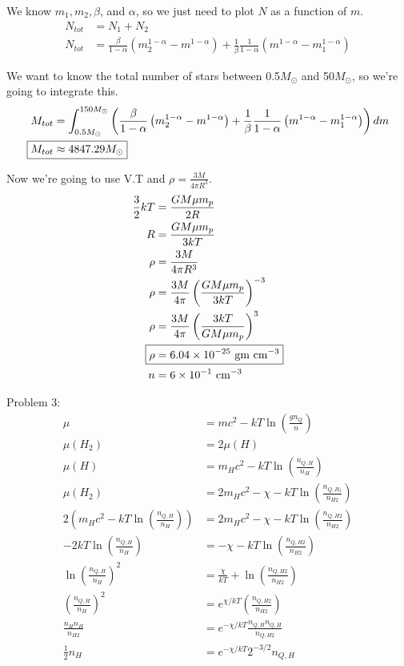 \documentclass[10pt,letter,preprint]{aastex}
\newcommand{\rp}{\right)}
\newcommand{\lp}{\left(}
\begin{document}
We know $m_{1},m_{2},\beta$, and $\alpha$, so we just need to plot $N$ as a function of $m$.
\begin{align}
N_{tot} &= N_{1}+N_{2} \\
N_{tot} &=  \frac{\beta}{1-\alpha} \lp m_{2}^{1-\alpha} - m^{1-\alpha} \rp + \frac{1}{\beta} \frac{1}{1-\alpha } \lp m^{1-\alpha} -m_{1}^{1-\alpha} \rp
\end{align}

We want to know the total number of stars between 0.5$M_{\odot}$ and 50$M_{\odot}$, so we're going to integrate this.%
%
\begin{align}
M_{tot} &=  \int_{0.5 M_{\odot}}^{150M_{\odot}}\lp  \frac{\beta}{1-\alpha} \lp m_{2}^{1-\alpha} - m^{1-\alpha} \rp + \frac{1}{\beta} \frac{1}{1-\alpha } \lp m^{1-\alpha} -m_{1}^{1-\alpha} \rp \rp dm\\
\Aboxed{M_{tot}&\approx 4847.29 M_{\odot}}
\end{align}

Now we're going to use V.T and $\rho = \frac{3M}{4 \pi R^{3}}$.
%
\begin{align}
\frac{3}{2}kT &= \frac{GM\mu m_p}{2R}\\
R &= \frac{GM\mu m_{p}}{3kT}\\
\rho &= \frac{3M}{4 \pi R^{3}}\\
\rho &=\frac{3M}{4\pi}\lp \frac{GM\mu m_{p}}{3kT} \rp^{-3}\\
\rho &=\frac{3M}{4\pi}\lp  \frac{3kT}{GM\mu m_{p}} \rp^{3}\\
\Aboxed{\rho&= 6.04 \times 10^{-25} \textrm{ gm cm}^{-3}}\\
n &= 6 \times 10^{-1} \textrm{ cm}^{-3}
\end{align}

\newpage
Problem 3:
%
\begin{align}
\mu &= mc^2 - kT \ln \lp \frac{gn_Q}{n} \rp\\
\mu(H_2) &= 2 \mu(H)\\
\mu(H) &= m_Hc^2 - kT \ln \lp \frac{n_{Q,H}}{n_H} \rp\\
\mu(H_2) &= 2m_Hc^2 - \chi -kT \ln \lp \frac{n_{Q,H_2}}{n_{H2}} \rp\\ %
2 \lp m_Hc^2 - kT \ln \lp \frac{n_{Q,H}}{n_H} \rp \rp &=2m_Hc^2 - \chi -kT \ln \lp \frac{n_{Q,H2}}{n_{H2}} \rp\\
-2kT \ln \lp \frac{n_{Q,H}}{n_H} \rp &= -\chi -kT \ln \lp \frac{n_{Q,H2}}{n_{H2}} \rp\\
\ln \lp \frac{n_{Q,H}}{n_H} \rp^2 &= \frac{\chi}{kT} + \ln \lp \frac{n_{Q,H2}}{n_{H2}} \rp\\
\lp \frac{n_{Q,H}}{n_H} \rp^2 &= e^{\chi/kT} \lp \frac{n_{Q,H2}}{n_{H2}} \rp\\
\frac{n_Hn_H}{n_{H2}} &= e^{-\chi/kT} \frac{n_{Q,H}n_{Q,H}}{n_{Q,H2}}\\
\frac{1}{2}n_H &= e^{-\chi/kT} 2^{-3/2}n_{Q,H}
\end{align}
\end{document}
